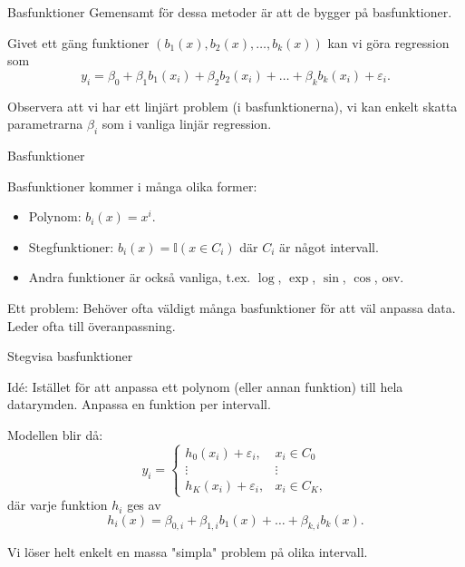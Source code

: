 \documentclass[10pt,english]{beamer}
\begin{document}
\begin{frame}{Basfunktioner}
    Gemensamt för dessa metoder är att de bygger på basfunktioner.

    Givet ett gäng funktioner $(b_1(x), b_2(x), \ldots, b_k(x))$ kan vi göra regression som
    \begin{equation*}
        y_i = \beta_0 + \beta_1 b_1(x_i) + \beta_2 b_2(x_i) + \ldots + \beta_k b_k(x_i) + \varepsilon_i.
    \end{equation*}

    Observera att vi har ett linjärt problem (i basfunktionerna), vi kan enkelt skatta parametrarna $\beta_i$ som i vanliga linjär regression.

\end{frame}

\begin{frame}{Basfunktioner}

    Basfunktioner kommer i många olika former:
    \begin{itemize}
        \item Polynom: $b_i(x) = x^i$.
        \item Stegfunktioner: $b_i(x) = \mathbb{I}(x \in C_i)$ där $C_i$ är något intervall.
        \item Andra funktioner är också vanliga, t.ex. $\log$, $\exp$, $\sin$, $\cos$, osv.
    \end{itemize}
    
    Ett problem: Behöver ofta väldigt många basfunktioner för att väl anpassa data. Leder ofta till överanpassning.

\end{frame}

\begin{frame}{Stegvisa basfunktioner}

    \begin{greenbox}
        Idé: Istället för att anpassa ett polynom (eller annan funktion) till hela datarymden. Anpassa en funktion per intervall.
    \end{greenbox}

    Modellen blir då:
    \begin{equation*}
        y_i = \begin{cases}
            h_0(x_i) + \varepsilon_i, & x_i \in C_0 \\
            \vdots & \vdots \\
            h_K(x_i) + \varepsilon_i, & x_i \in C_K,
        \end{cases}
    \end{equation*}
    där varje funktion $h_i$ ges av
    \begin{equation*}
        h_i(x) = \beta_{0,i} + \beta_{1,i} b_1(x) + \ldots + \beta_{k,i} b_k(x).
    \end{equation*}

    Vi löser helt enkelt en massa "simpla" problem på olika intervall.
    
\end{frame}
\end{document}
